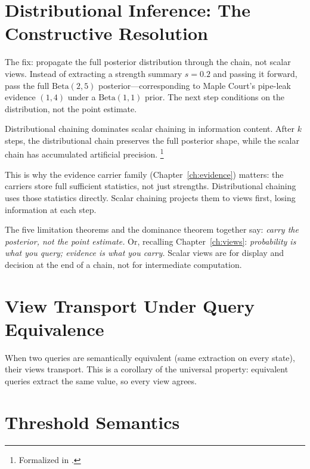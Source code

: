 \documentclass[11pt,openany]{report}
\begin{document}
\section{Distributional Inference: The Constructive Resolution}

The fix: propagate the full posterior distribution through the chain,
not scalar views.  Instead of extracting a strength summary $s = 0.2$
and passing it forward, pass the full $\text{Beta}(2, 5)$
posterior---corresponding to Maple Court's pipe-leak evidence $(1, 4)$
under a $\text{Beta}(1, 1)$ prior.  The next step conditions on the
distribution, not the point estimate.

\begin{theorem}
Distributional chaining dominates scalar chaining in information
content.  After $k$ steps, the distributional chain preserves the
full posterior shape, while the scalar chain has accumulated artificial
precision.%
\footnote{Formalized in
.}
\end{theorem}

\noindent
This is why the evidence carrier family (Chapter~\ref{ch:evidence})
matters: the carriers store full sufficient statistics, not just
strengths.  Distributional chaining uses those statistics directly.
Scalar chaining projects them to views first, losing information at
each step.

The five limitation theorems and the dominance theorem together say:
\emph{carry the posterior, not the point estimate.}  Or, recalling
Chapter~\ref{ch:views}: \emph{probability is what you query;
evidence is what you carry.}  Scalar views are for display and
decision at the end of a chain, not for intermediate computation.

\section{View Transport Under Query Equivalence}

When two queries are semantically equivalent (same extraction on
every state), their views transport.  This is a corollary of the
universal property: equivalent queries extract the same value, so
every view agrees.

\section{Threshold Semantics}
\end{document}
